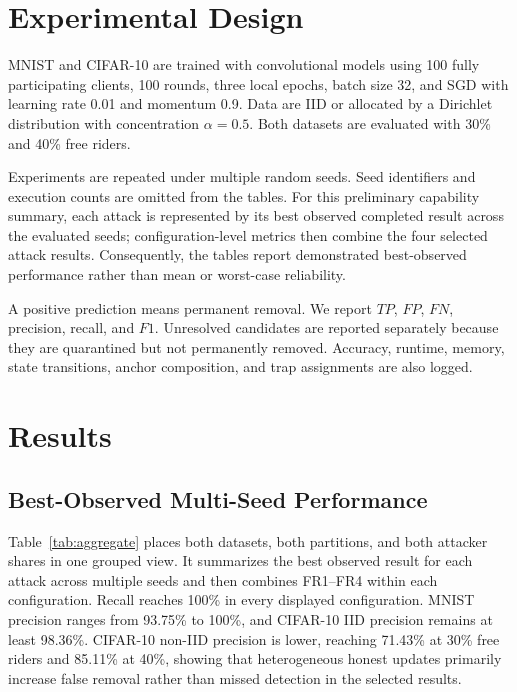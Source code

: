 \documentclass[conference]{IEEEtran}
\begin{document}
\section{Experimental Design}
MNIST \cite{lecun1998gradient} and CIFAR-10 \cite{krizhevsky2009learning} are trained with convolutional models using 100 fully participating clients, 100 rounds, three local epochs, batch size 32, and SGD with learning rate 0.01 and momentum 0.9. Data are IID or allocated by a Dirichlet distribution with concentration $\alpha=0.5$. Both datasets are evaluated with 30\% and 40\% free riders.

Experiments are repeated under multiple random seeds. Seed identifiers and execution counts are omitted from the tables. For this preliminary capability summary, each attack is represented by its best observed completed result across the evaluated seeds; configuration-level metrics then combine the four selected attack results. Consequently, the tables report demonstrated best-observed performance rather than mean or worst-case reliability.

A positive prediction means permanent removal. We report $TP$, $FP$, $FN$, precision, recall, and $F1$. Unresolved candidates are reported separately because they are quarantined but not permanently removed. Accuracy, runtime, memory, state transitions, anchor composition, and trap assignments are also logged.

\section{Results}
\subsection{Best-Observed Multi-Seed Performance}
Table~\ref{tab:aggregate} places both datasets, both partitions, and both attacker shares in one grouped view. It summarizes the best observed result for each attack across multiple seeds and then combines FR1--FR4 within each configuration. Recall reaches 100\% in every displayed configuration. MNIST precision ranges from 93.75\% to 100\%, and CIFAR-10 IID precision remains at least 98.36\%. CIFAR-10 non-IID precision is lower, reaching 71.43\% at 30\% free riders and 85.11\% at 40\%, showing that heterogeneous honest updates primarily increase false removal rather than missed detection in the selected results.
\end{document}
